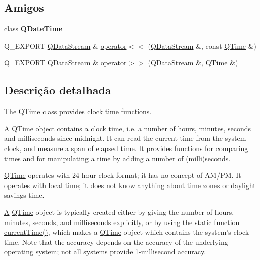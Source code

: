 \subsection*{Amigos}
\begin{DoxyCompactItemize}
\item 
\hypertarget{class_q_time_a9d2632bde958bcaf78a589a11578452e}{class {\bfseries Q\-Date\-Time}}\label{class_q_time_a9d2632bde958bcaf78a589a11578452e}

\item 
Q\-\_\-\-E\-X\-P\-O\-R\-T \hyperlink{class_q_data_stream}{Q\-Data\-Stream} \& \hyperlink{class_q_time_ac9b1103cf5f3deed4e057628fceca24d}{operator$<$$<$} (\hyperlink{class_q_data_stream}{Q\-Data\-Stream} \&, const \hyperlink{class_q_time}{Q\-Time} \&)
\item 
Q\-\_\-\-E\-X\-P\-O\-R\-T \hyperlink{class_q_data_stream}{Q\-Data\-Stream} \& \hyperlink{class_q_time_a6b14dcf689d047394691ac627c5d2074}{operator$>$$>$} (\hyperlink{class_q_data_stream}{Q\-Data\-Stream} \&, \hyperlink{class_q_time}{Q\-Time} \&)
\end{DoxyCompactItemize}


\subsection{Descrição detalhada}
The \hyperlink{class_q_time}{Q\-Time} class provides clock time functions. 

\hyperlink{class_a}{A} \hyperlink{class_q_time}{Q\-Time} object contains a clock time, i.\-e. a number of hours, minutes, seconds and milliseconds since midnight. It can read the current time from the system clock, and measure a span of elapsed time. It provides functions for comparing times and for manipulating a time by adding a number of (milli)seconds.

\hyperlink{class_q_time}{Q\-Time} operates with 24-\/hour clock format; it has no concept of A\-M/\-P\-M. It operates with local time; it does not know anything about time zones or daylight savings time.

\hyperlink{class_a}{A} \hyperlink{class_q_time}{Q\-Time} object is typically created either by giving the number of hours, minutes, seconds, and milliseconds explicitly, or by using the static function \hyperlink{class_q_time_ab6a608d4dd52b3aa94cffe8548ff21d5}{current\-Time()}, which makes a \hyperlink{class_q_time}{Q\-Time} object which contains the system's clock time. Note that the accuracy depends on the accuracy of the underlying operating system; not all systems provide 1-\/millisecond accuracy.

